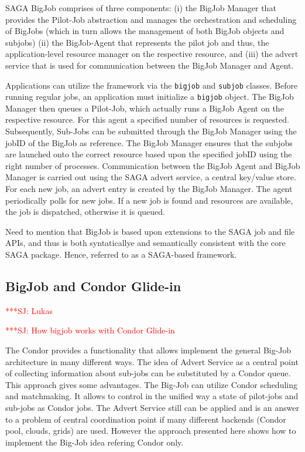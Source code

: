 \documentclass[conference,final]{IEEEtran}
\newcommand{\jhanote}[1]{ {\textcolor{red} { ***SJ: #1 }}}
\newcommand{\jhanote}[1]{}
\begin{document}
SAGA BigJob comprises of three components: (i) the BigJob Manager that
provides the Pilot-Job abstraction and manages the orchestration and
scheduling of BigJobs (which in turn allows the management of both
BigJob objects and subjobs) (ii) the BigJob-Agent that represents the
pilot job and thus, the application-level resource manager on the
respective resource, and (iii) the advert service that is used for
communication between the BigJob Manager and Agent.

Applications can utilize the framework via the \texttt{bigjob} and
\texttt{subjob} classes.  Before running regular jobs, an application
must initialize a \texttt{bigjob} object.  The BigJob Manager then
queues a Pilot-Job, which actually runs a BigJob Agent on the
respective resource. For this agent a specified number of resources is
requested. Subsequently, Sub-Jobs can be submitted through the BigJob
Manager using the jobID of the BigJob as reference. The BigJob
Manager ensures that the subjobs are launched onto the correct
resource based upon the specified jobID using the right number of
processes. Communication between the BigJob Agent and BigJob Manager
is carried out using the SAGA advert service, a central key/value
store. For each new job, an advert entry is created by the BigJob
Manager. The agent periodically polls for new jobs. If a new job is
found and resources are available, the job is dispatched, otherwise it
is queued.

Need to mention that BigJob is based upon extensions to the SAGA job
and file APIs, and thus is both syntaticallye and semantically
consistent with the core SAGA package. Hence, referred to as a
SAGA-based framework.


\subsection{BigJob and Condor Glide-in} \jhanote{Lukas}


\jhanote{How bigjob works with Condor Glide-in}

The Condor provides a functionality that allows implement the general Big-Job architecture in many different ways. The idea of Advert Service as a central point of collecting information about sub-jobs can be substituted by a Condor queue. This approach gives some advantages. The Big-Job can utilize Condor scheduling and matchmaking. It allows to control in the unified way a state of pilot-jobs and sub-jobs as Condor jobs. The Advert Service still can be applied and is an answer to a problem of central coordination point if many different backends (Condor pool, clouds, grids) are used.  However the approach presented here shows how to implement the Big-Job idea refering Condor only.
\end{document}
